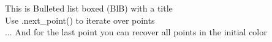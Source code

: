 \documentclass[preview]{standalone}
\begin{document}
This is Bulleted list boxed (BlB) with a title\\Use .next\_point() to iterate over points\\... And for the last point you can recover all points in the initial color\\
\end{document}
